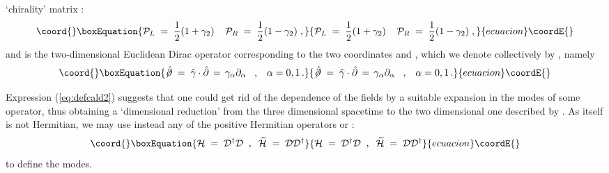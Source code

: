\documentclass[a4paper,12pt]{article}
\begin{document}
`chirality' matrix \coordHE{}:
\begin{equation}\coord{}\boxEquation{
  \label{eq:defplr}
{\mathcal P}_L \;=\; \frac{1}{2} (1 + \gamma_2) \;\;\;\;
{\mathcal P}_R \;=\; \frac{1}{2} (1 - \gamma_2) \;,
}{
  {\mathcal P}_L \;=\; \frac{1}{2} (1 + \gamma_2) \;\;\;\;
{\mathcal P}_R \;=\; \frac{1}{2} (1 - \gamma_2) \;,
}{ecuacion}\coordE{}\end{equation}
and \myHighlight{$\not \! {\hat \partial}$}\coordHE{} is the two-dimensional Euclidean Dirac
operator corresponding to the two coordinates \coordHE{} and \coordHE{}, which
we denote collectively by \coordHE{}, namely
\begin{equation}\coord{}\boxEquation{
  \label{eq:defsmalld}
\not \! {\hat \partial}\;=\; {\hat \gamma} \cdot {\hat \partial} \,=\, \gamma_\alpha \partial_\alpha \;\;\;, 
\;\;\; \alpha = 0, 1\,.
}{
  \not \! {\hat \partial}\;=\; {\hat \gamma} \cdot {\hat \partial} \,=\, \gamma_\alpha \partial_\alpha \;\;\;, 
\;\;\; \alpha = 0, 1\,.
}{ecuacion}\coordE{}\end{equation}

Expression (\ref{eq:defcald2}) suggests that one could get rid of the
\coordHE{} dependence of the fields by a suitable expansion in the modes of
some operator, thus obtaining a `dimensional reduction' from the three
dimensional spacetime to the two dimensional one described by \coordHE{}. As \coordHE{} itself is not Hermitian, we may use instead
any of the positive Hermitian operators \coordHE{} or
\coordHE{}:
\begin{equation}\coord{}\boxEquation{
  \label{eq:defhht}
{\mathcal H} \;=\; {\mathcal D}^\dagger {\mathcal D} \;\;,\;\;
{\widetilde{\mathcal H}} \;=\; {\mathcal D} {\mathcal D}^\dagger 
}{
  {\mathcal H} \;=\; {\mathcal D}^\dagger {\mathcal D} \;\;,\;\;
{\widetilde{\mathcal H}} \;=\; {\mathcal D} {\mathcal D}^\dagger 
}{ecuacion}\coordE{}\end{equation}
to define the modes.
\end{document}
